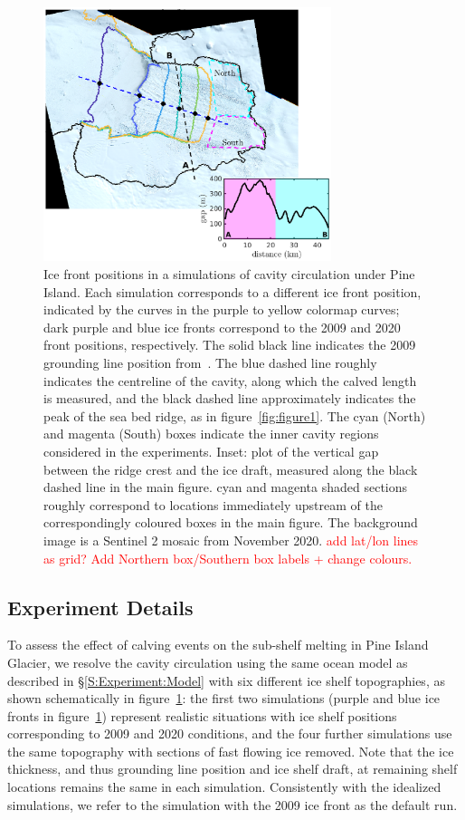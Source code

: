 \documentclass[draft]{agujournal2019}
\newcommand{\red}[1]{\textcolor{red}{#1}}
\begin{document}
\begin{figure}
    \centering
    \includegraphics[width = 0.75\textwidth]{../make_figures/plots/figure10.eps}
    \caption{Ice front positions in a simulations of cavity circulation under Pine Island. Each simulation corresponds to a different ice front position, indicated by the curves in the purple to yellow colormap curves; dark purple and blue ice fronts correspond to the 2009 and 2020 front positions, respectively. The solid black line indicates the 2009 grounding line position from~\cite{Joughin2010GRL}. The blue dashed line roughly indicates the centreline of the cavity, along which the calved length is measured, and the black dashed line approximately indicates the peak of the sea bed ridge, as in figure~\ref{fig:figure1}. The cyan (North) and magenta (South) boxes indicate the inner cavity regions considered in the experiments. Inset: plot of the vertical gap between the ridge crest and the ice draft, measured along the black dashed line in the main figure. cyan and magenta shaded sections roughly correspond to locations immediately upstream of the correspondingly coloured boxes in the main figure. The background image is a Sentinel 2 mosaic from November 2020. \red{add lat/lon lines as grid? Add Northern box/Southern box labels + change colours.}}
    \label{fig:figure10}
\end{figure}

\subsection{Experiment Details}
To assess the effect of calving events on the sub-shelf melting in Pine Island Glacier, we resolve the cavity circulation using the same ocean model as described in \S\ref{S:Experiment:Model} with six different ice shelf topographies, as shown schematically in figure~\ref{fig:figure10}: the first two simulations (purple and blue ice fronts in figure~\ref{fig:figure10}) represent realistic situations with ice shelf positions corresponding to 2009 and 2020 conditions, and the four further simulations use the same topography with sections of fast flowing ice removed. Note that the ice thickness, and thus grounding line position and ice shelf draft, at remaining shelf locations remains the same in each simulation. Consistently with the idealized simulations, we refer to the simulation with the 2009 ice front as the default run.
\end{document}
